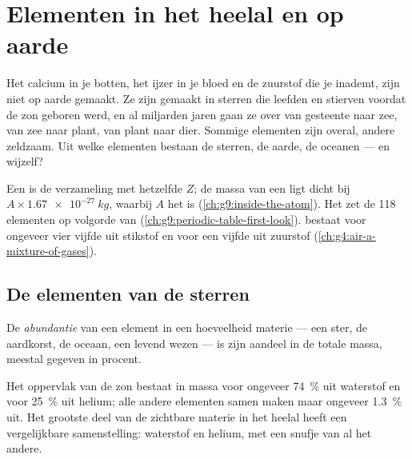 \chapter{Elementen in het heelal en op aarde}\label{ch:g9:elements-universe-earth}

Het calcium in je botten, het ijzer in je bloed en de zuurstof die je
inademt, zijn niet op aarde gemaakt. Ze zijn gemaakt in sterren die
leefden en stierven voordat de zon geboren werd, en al miljarden jaren
gaan ze over van gesteente naar zee, van zee naar plant, van plant naar
dier. Sommige elementen zijn overal, andere zeldzaam. Uit welke
elementen bestaan de sterren, de aarde, de oceanen --- en wijzelf?

\begin{recall}
Een  is de verzameling  met hetzelfde 
$Z$; de massa van een  ligt dicht bij $A \times \qty{1.67e-27}{kg}$,
waarbij $A$ het  is (\cref{ch:g9:inside-the-atom}). Het
 zet de 118 elementen op volgorde van 
(\cref{ch:g9:periodic-table-first-look}).  bestaat voor ongeveer
vier vijfde uit stikstof en voor een vijfde uit zuurstof
(\cref{ch:g4:air-a-mixture-of-gases}).
\end{recall}

\section{De elementen van de sterren}

\begin{definition}[Abundantie]\label{def:g9:elements-universe-earth:abundance}
De \emph{abundantie} van een element in een
hoeveelheid materie --- een ster, de aardkorst, de oceaan, een levend
wezen --- is zijn aandeel in de totale massa, meestal gegeven in
procent.
\end{definition}

\begin{proposition}\label{prop:g9:elements-universe-earth:sun}
Het oppervlak van de zon bestaat in massa voor ongeveer
\qty{74}{\percent} uit waterstof en voor \qty{25}{\percent} uit helium;
alle andere elementen samen maken maar ongeveer \qty{1.3}{\percent} uit.
Het grootste deel van de zichtbare materie in het heelal heeft een
vergelijkbare samenstelling: waterstof en helium, met een snufje van al
het andere.
\end{proposition}

